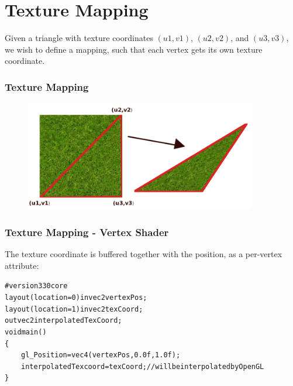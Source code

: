 \documentclass{beamer}
\begin{document}
\section{Texture Mapping}
\begin{frame}
Given a triangle with texture coordinates $(u1,v1)$, $(u2,v2)$, and $(u3,v3)$,
we wish to define a mapping, such that each vertex gets its own
texture coordinate.
\frametitle{Texture Mapping}
\begin{figure}
\includegraphics[width=0.9\textwidth]{images/textureMapping.png}
\end{figure}
\end{frame}


%
%
%
\begin{frame}
\frametitle{Texture Mapping - Vertex Shader}
The texture coordinate is buffered together with the position,
as a per-vertex attribute:
\begin{alltt}\footnotesize
\#version 330 core\\

layout (location = 0) in vec2 vertexPos;\\
layout (location = 1) in vec2 texCoord;\\

out vec2 interpolatedTexCoord;\\

void main()\\
\{\\
\ensuremath{\qquad}gl\_Position = vec4(vertexPos, 0.0f, 1.0f);\\
\ensuremath{\qquad}interpolatedTexcoord = texCoord; // will be interpolated by OpenGL\\
\}
\end{alltt}
\end{frame}
\end{document}
